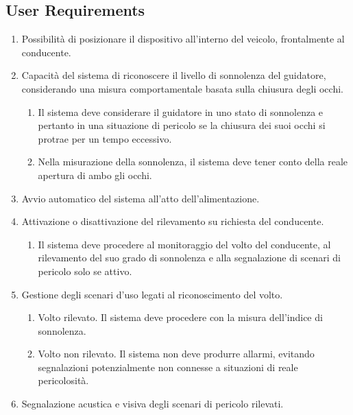 \documentclass[12pt]{article}
\begin{document}
\subsection{User Requirements}
\begin{enumerate}
	\item Possibilità di posizionare il dispositivo all'interno del veicolo, frontalmente al conducente.
	\item Capacità del sistema di riconoscere il livello di sonnolenza del guidatore, considerando una misura comportamentale basata sulla chiusura degli occhi.
	\begin{enumerate}
		\item Il sistema deve considerare il guidatore in uno stato di sonnolenza e pertanto in una situazione di pericolo se la chiusura dei suoi occhi si protrae per un tempo eccessivo.
		\item Nella misurazione della sonnolenza, il sistema deve tener conto della reale apertura di ambo gli occhi.
	\end{enumerate}
	\item Avvio automatico del sistema all'atto dell'alimentazione.
	\item Attivazione o disattivazione del rilevamento su richiesta del conducente.
	\begin{enumerate}
		\item Il sistema deve procedere al monitoraggio del volto del conducente, al rilevamento del suo grado di sonnolenza e alla segnalazione di scenari di pericolo solo se attivo.
	\end{enumerate}
	\item Gestione degli scenari d'uso legati al riconoscimento del volto.
	\begin{enumerate}
		\item Volto rilevato. Il sistema deve procedere con la misura dell'indice di sonnolenza.
		\item Volto non rilevato. Il sistema non deve produrre allarmi, evitando segnalazioni potenzialmente non connesse a situazioni di reale pericolosità.
	\end{enumerate}
	\item Segnalazione acustica e visiva degli scenari di pericolo rilevati.
\end{enumerate}
\end{document}
